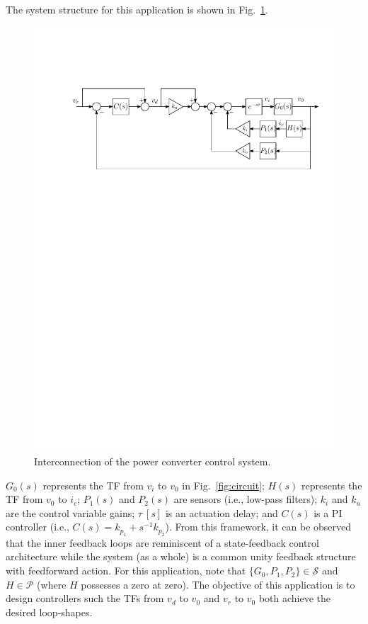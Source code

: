 \documentclass[a4paper, 10pt, conference]{ieeeconf}
\begin{document}
The system structure for this application is shown in Fig.~\ref{fig:damping_loop}. 
\begin{figure}
\centering
\includegraphics[width=\columnwidth]{../pics/damping_loop_full}
\caption{Interconnection of the power converter control system. }
\label{fig:damping_loop}
\end{figure}
$G_0(s)$ represents the TF from $v_i$ to $v_0$ in Fig.~\ref{fig:circuit}; $H(s)$ represents the TF from $v_0$ to $i_c$; $P_1(s)$ and $P_2(s)$ are sensors (i.e., low-pass filters); $k_i$ and $k_u$ are the control variable gains; $\tau \: [s]$ is an actuation delay; and $C(s)$ is a PI controller (i.e., $C(s) = k_{p_1} + s^{-1}k_{p_2}$). From this framework, it can be observed that the inner feedback loops are reminiscent of a state-feedback control architecture while the system (as a whole) is a common unity feedback structure with feedforward action. For this application, note that $\{G_0,P_1,P_2 \} \in \mathscr{S}$ and $H \in \mathscr{P}$ (where $H$ possesses a zero at zero). The objective of this application is to design controllers such the TFs from $v_d$ to $v_0$ and $v_r$ to $v_0$ both achieve the desired loop-shapes.
\end{document}

